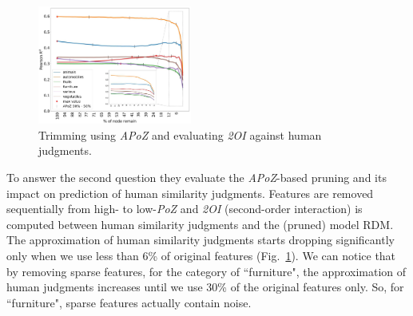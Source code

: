 \begin{figure}
  \centering
  \includegraphics[width=0.45\textwidth]{images/apoz_4.png}
  \caption{Trimming using \textit{APoZ} and evaluating \textit{2OI} against human judgments.}
  \label{fig:apoz_4}
\end{figure}

To answer the second question they evaluate the \textit{APoZ}-based pruning and its impact on prediction of human similarity judgments. Features are removed sequentially from high- to low-\textit{PoZ} and \textit{2OI} (second-order interaction) is computed between human similarity judgments and the (pruned) model RDM.
The approximation of human similarity judgments starts dropping significantly only when we use less than 6\% of original features (Fig.~\ref{fig:apoz_4}).
We can notice that by removing sparse features, for the category of ``furniture", the approximation of human judgments increases until we use 30\% of the original features only. So, for ``furniture", sparse features actually contain noise.

